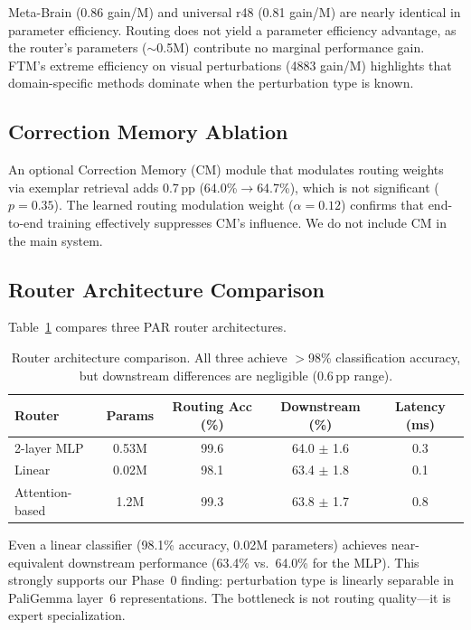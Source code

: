 \documentclass[letterpaper]{article}
\newcommand{\ours}{Meta-Brain}
\newcommand{\pp}{\,\text{pp}}
\begin{document}
\ours{} (0.86 gain/M) and universal r48 (0.81 gain/M) are nearly identical in parameter efficiency. Routing does not yield a parameter efficiency advantage, as the router's parameters ($\sim$0.5M) contribute no marginal performance gain. FTM's extreme efficiency on visual perturbations (4883 gain/M) highlights that domain-specific methods dominate when the perturbation type is known.

\subsection{Correction Memory Ablation}
\label{sec:cm}

An optional Correction Memory (CM) module that modulates routing weights via exemplar retrieval adds 0.7$\pp$ (64.0\%$\to$64.7\%), which is not significant ($p = 0.35$). The learned routing modulation weight ($\alpha = 0.12$) confirms that end-to-end training effectively suppresses CM's influence. We do not include CM in the main system.

\subsection{Router Architecture Comparison}
\label{sec:router_arch}

Table~\ref{tab:router_arch} compares three PAR router architectures.

\begin{table}[h]
\centering
\caption{Router architecture comparison. All three achieve $>$98\% classification accuracy, but downstream differences are negligible (0.6$\pp$ range).}
\label{tab:router_arch}
\small
\begin{tabular}{lcccc}
\toprule
\textbf{Router} & \textbf{Params} & \textbf{Routing Acc (\%)} & \textbf{Downstream (\%)} & \textbf{Latency (ms)} \\
\midrule
2-layer MLP & 0.53M & 99.6 & 64.0 $\pm$ 1.6 & 0.3 \\
Linear & 0.02M & 98.1 & 63.4 $\pm$ 1.8 & 0.1 \\
Attention-based & 1.2M & 99.3 & 63.8 $\pm$ 1.7 & 0.8 \\
\bottomrule
\end{tabular}
\end{table}

Even a linear classifier (98.1\% accuracy, 0.02M parameters) achieves near-equivalent downstream performance (63.4\% vs.\ 64.0\% for the MLP). This strongly supports our Phase~0 finding: perturbation type is linearly separable in PaliGemma layer~6 representations. The bottleneck is not routing quality---it is expert specialization.
\end{document}
